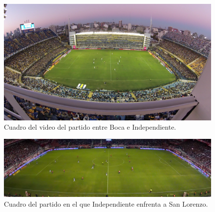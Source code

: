 \begin{figure}[H]
  \centering
  \includegraphics[width=\linewidth]{./images/boca-figura.png}
  \caption{Cuadro del video del partido entre Boca e Independiente.}
  \label{fig:boca-figura}
\end{figure}
\begin{figure}[H]
  \centering
  \includegraphics[width=\linewidth]{./images/independ-figura.png}
  \caption{Cuadro del partido en el que Independiente enfrenta a San Lorenzo.}
  \label{fig:independ-figura}
\end{figure}
